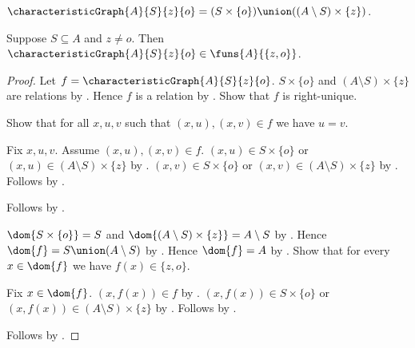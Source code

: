 \begin{definition}\label{characteristic_graph}
    $\characteristicGraph{A}{S}{z}{o}
        =(S\times\{o\})\union((A\setminus S)\times\{z\})$.
\end{definition}

\begin{proposition}\label{characteristic_graph_type}
    Suppose $S\subseteq A$ and $z\neq o$.
    Then $\characteristicGraph{A}{S}{z}{o}\in\funs{A}{\{z,o\}}$.
\end{proposition}
\begin{proof}
    Let $f=\characteristicGraph{A}{S}{z}{o}$.
    $S\times\{o\}$ and $(A\setminus S)\times\{z\}$ are relations
        by .
    Hence $f$ is a relation
        by .
    Show that $f$ is right-unique.
    \begin{subproof}
        Show that for all $x,u,v$ such that $(x,u),(x,v)\in f$
            we have $u=v$.
        \begin{subproof}
            Fix $x,u,v$.
            Assume $(x,u),(x,v)\in f$.
            $(x,u)\in S\times\{o\}$ or
                $(x,u)\in(A\setminus S)\times\{z\}$
                by .
            $(x,v)\in S\times\{o\}$ or
                $(x,v)\in(A\setminus S)\times\{z\}$
                by .
            Follows by
                .
        \end{subproof}
        Follows by .
    \end{subproof}
    $\dom{S\times\{o\}}=S$ and
        $\dom{(A\setminus S)\times\{z\}}=A\setminus S$
        by
        .
    Hence $\dom{f}=S\union(A\setminus S)$
        by .
    Hence $\dom{f}=A$ by .
    Show that for every $x\in\dom{f}$ we have $f(x)\in\{z,o\}$.
    \begin{subproof}
        Fix $x\in\dom{f}$.
        $(x,f(x))\in f$ by .
        $(x,f(x))\in S\times\{o\}$ or
            $(x,f(x))\in(A\setminus S)\times\{z\}$
            by .
        Follows by .
    \end{subproof}
    Follows by .
\end{proof}

